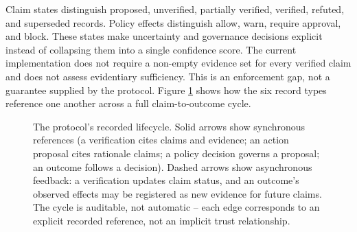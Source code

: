 \documentclass[11pt]{article}
\begin{document}
Claim states distinguish proposed, unverified, partially verified, verified,
refuted, and superseded records. Policy effects distinguish allow, warn,
require approval, and block. These states make uncertainty and governance
decisions explicit instead of collapsing them into a single confidence score.
The current implementation does not require a non-empty evidence set for every
verified claim and does not assess evidentiary sufficiency. This is an
enforcement gap, not a guarantee supplied by the protocol. Figure
\ref{fig:protocol-lifecycle} shows how the six record types reference one
another across a full claim-to-outcome cycle.

\begin{figure}[H]
\centering
{}
\caption{The protocol's recorded lifecycle. Solid arrows show synchronous
references (a verification cites claims and evidence; an action proposal
cites rationale claims; a policy decision governs a proposal; an outcome
follows a decision). Dashed arrows show asynchronous feedback: a verification
updates claim status, and an outcome's observed effects may be registered as
new evidence for future claims. The cycle is auditable, not automatic --
each edge corresponds to an explicit recorded reference, not an implicit
trust relationship.}
\label{fig:protocol-lifecycle}
\end{figure}
\end{document}
